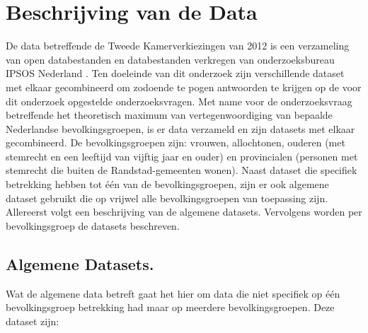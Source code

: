 \newpage
\section{Beschrijving van de Data}
\label{sec:meth}

De data betreffende de Tweede Kamerverkiezingen van 2012 is een verzameling van open databestanden en databestanden verkregen van onderzoeksbureau IPSOS Nederland \citeyearpar{IPSOS}.
Ten doeleinde van dit onderzoek zijn verschillende dataset met elkaar gecombineerd om zodoende te pogen antwoorden te krijgen op de voor dit onderzoek opgestelde onderzoeksvragen. Met name voor de onderzoeksvraag betreffende het theoretisch maximum van vertegenwoordiging van bepaalde Nederlandse bevolkingsgroepen, is er data verzameld en zijn datasets met elkaar gecombineerd. De bevolkingsgroepen zijn: vrouwen, allochtonen, ouderen (met stemrecht en een leeftijd van vijftig jaar en ouder) en provincialen (personen met stemrecht die buiten de Randstad-gemeenten wonen). Naast dataset die specifiek betrekking hebben tot één van de bevolkingsgroepen, zijn er ook algemene dataset gebruikt die op vrijwel alle bevolkingsgroepen van toepassing zijn. Allereerst volgt een beschrijving van de algemene datasets. Vervolgens worden per bevolkingsgroep de datasets beschreven.

\subsection*{Algemene Datasets.}
Wat de algemene data betreft gaat het hier om data die niet specifiek op één bevolkingsgroep betrekking had maar op meerdere bevolkingsgroepen. Deze dataset zijn: \\


